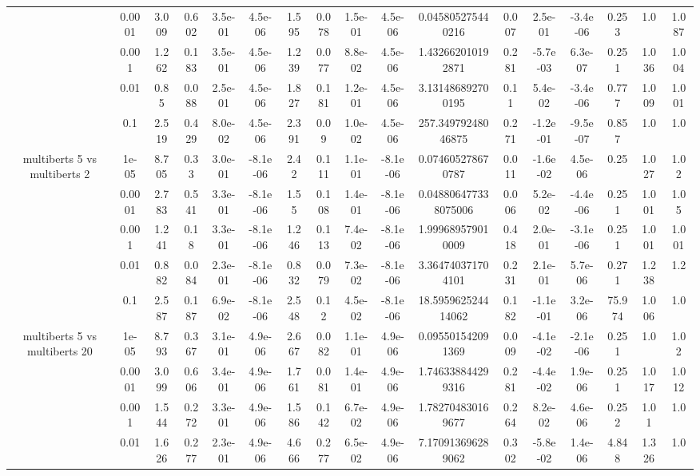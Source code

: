 \begin{tabular}{|c|c|c|c|c|c|c|c|c|c|c|c|c|c|c|c|c|}
 & 0.0001 & 3.009 & 0.602 & 3.5e-01 & 4.5e-06 & 1.595 & 0.078 & 1.5e-01 & 4.5e-06 & 0.045805275440216 & 0.007 & 2.5e-01 & -3.4e-06 & 0.253 & 1.0 & 1.087 \\
 & 0.001 & 1.262 & 0.183 & 3.5e-01 & 4.5e-06 & 1.239 & 0.077 & 8.8e-02 & 4.5e-06 & 1.432662010192871 & 0.281 & -5.7e-03 & 6.3e-07 & 0.251 & 1.036 & 1.004 \\
 & 0.01 & 0.85 & 0.088 & 2.5e-01 & 4.5e-06 & 1.827 & 0.181 & 1.2e-01 & 4.5e-06 & 3.131486892700195 & 0.11 & 5.4e-02 & -3.4e-06 & 0.777 & 1.009 & 1.001 \\
 & 0.1 & 2.519 & 0.429 & 8.0e-02 & 4.5e-06 & 2.391 & 0.09 & 1.0e-02 & 4.5e-06 & 257.34979248046875 & 0.271 & -1.2e-01 & -9.5e-07 & 0.857 & 1.0 & 1.0 \\
\hline
\multirow{5}{*}{multiberts 5 vs multiberts 2} & 1e-05 & 8.705 & 0.33 & 3.0e-01 & -8.1e-06 & 2.42 & 0.111 & 1.1e-01 & -8.1e-06 & 0.074605278670787 & 0.011 & -1.6e-02 & 4.5e-06 & 0.25 & 1.027 & 1.02 \\
 & 0.0001 & 2.783 & 0.541 & 3.3e-01 & -8.1e-06 & 1.55 & 0.108 & 1.4e-01 & -8.1e-06 & 0.048806477338075006 & 0.006 & 5.2e-02 & -4.4e-06 & 0.251 & 1.001 & 1.05 \\
 & 0.001 & 1.241 & 0.18 & 3.3e-01 & -8.1e-06 & 1.246 & 0.113 & 7.4e-02 & -8.1e-06 & 1.999689579010009 & 0.418 & 2.0e-01 & -3.1e-06 & 0.251 & 1.001 & 1.001 \\
 & 0.01 & 0.882 & 0.084 & 2.3e-01 & -8.1e-06 & 0.832 & 0.079 & 7.3e-02 & -8.1e-06 & 3.364740371704101 & 0.231 & 2.1e-01 & 5.7e-06 & 0.271 & 1.238 & 1.2 \\
 & 0.1 & 2.587 & 0.187 & 6.9e-02 & -8.1e-06 & 2.548 & 0.12 & 4.5e-02 & -8.1e-06 & 18.595962524414062 & 0.182 & -1.1e-01 & 3.2e-06 & 75.974 & 1.006 & 1.0 \\
\hline
\multirow{5}{*}{multiberts 5 vs multiberts 20} & 1e-05 & 8.793 & 0.367 & 3.1e-01 & 4.9e-06 & 2.667 & 0.082 & 1.1e-01 & 4.9e-06 & 0.095501542091369 & 0.009 & -4.1e-02 & -2.1e-06 & 0.251 & 1.0 & 1.02 \\
 & 0.0001 & 3.099 & 0.606 & 3.4e-01 & 4.9e-06 & 1.761 & 0.081 & 1.4e-01 & 4.9e-06 & 1.746338844299316 & 0.281 & -4.4e-02 & 1.9e-06 & 0.251 & 1.017 & 1.012 \\
 & 0.001 & 1.544 & 0.272 & 3.3e-01 & 4.9e-06 & 1.586 & 0.142 & 6.7e-02 & 4.9e-06 & 1.782704830169677 & 0.264 & 8.2e-02 & 4.6e-06 & 0.252 & 1.01 & 1.0 \\
 & 0.01 & 1.626 & 0.277 & 2.3e-01 & 4.9e-06 & 4.666 & 0.277 & 6.5e-02 & 4.9e-06 & 7.170913696289062 & 0.302 & -5.8e-02 & 1.4e-06 & 4.848 & 1.326 & 1.0 \\

\end{tabular}
